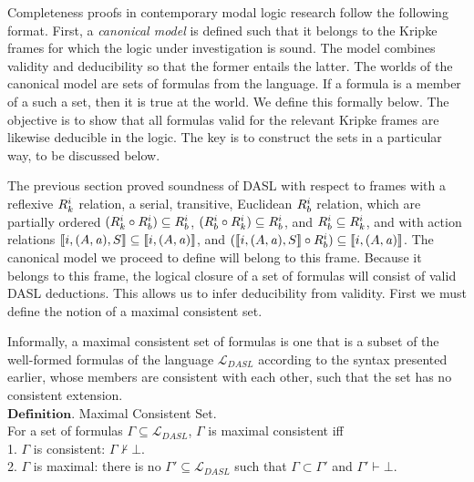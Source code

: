 Completeness proofs in contemporary modal logic research follow the following format. First, a \emph{canonical model} is defined such that it belongs to the Kripke frames for which the logic under investigation is sound. The model combines validity and deducibility so that the former entails the latter. The worlds of the canonical model are sets of formulas from the language. If a formula is a member of a such a set, then it is true at the world. We define this formally below. The objective is to show that all formulas valid for the relevant Kripke frames are likewise deducible in the logic. The key is to construct the sets in a particular way, to be discussed below.

The previous section proved soundness of DASL with respect to frames with a reflexive $R_{k}^i$ relation, a serial, transitive, Euclidean $R_{b}^i$ relation, which are partially ordered $(R_{k}^i \circ R_{b}^i) \subseteq R_{b}^i$, $(R_{b}^i \circ R_{k}^i) \subseteq R_{b}^i$, and $R_{b}^i \subseteq R_{k}^i$, and with action relations  $\llbracket i,(A,\mathit{a}),S\rrbracket \subseteq \llbracket i,(A,\mathit{a})\rrbracket$, and $(\llbracket i,(A,\mathit{a}),S\rrbracket \circ R_{b}^i) \subseteq \llbracket i, (A,\mathit{a})\rrbracket$. The canonical model we proceed to define will belong to this frame. Because it belongs to this frame, the logical closure of a set of formulas will consist of valid DASL deductions. This allows us to infer deducibility from validity. First we must define the notion of a maximal consistent set.
 
Informally, a maximal consistent set of formulas is one that is a subset of the well-formed formulas of the language $\mathcal{L}_{DASL}$ according to the syntax presented earlier, whose members are consistent with each other, such that the set has no consistent extension. \\
$\mathbf{Definition}$. Maximal Consistent Set.\\
For a set of formulas $\Gamma \subseteq \mathcal{L}_{DASL}$, $\Gamma$ is maximal consistent iff\\
1. $\Gamma$ is consistent: $\Gamma \not \vdash \bot$.\\
2. $\Gamma$ is maximal: there is no $\Gamma'\subseteq\mathcal{L}_{DASL}$ such that $\Gamma \subset \Gamma'$ and $\Gamma'\vdash\bot$.\\

